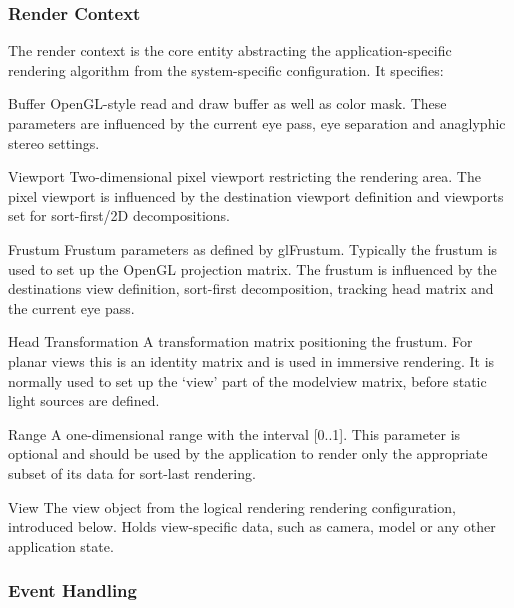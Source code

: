 \subsubsection{Render Context}

The render context is the core entity abstracting the application-specific
rendering algorithm from the system-specific configuration. It specifies:

\begin{compactdesc}

 \item[Buffer] OpenGL-style read and draw buffer as well as color mask. These
 parameters are influenced by the current eye pass, eye separation and
 anaglyphic stereo settings.

 \item[Viewport] Two-dimensional pixel viewport restricting the rendering area.
 The pixel viewport is influenced by the destination viewport definition and
 viewports set for sort-first/2D decompositions.

 \item[Frustum] Frustum parameters as defined by \textsf{glFrustum}. Typically
 the frustum is used to set up the OpenGL projection matrix. The frustum is
 influenced by the destinations view definition, sort-first decomposition,
 tracking head matrix and the current eye pass.

 \item[Head Transformation] A transformation matrix positioning the frustum. For
 planar views this is an identity matrix and is used in immersive rendering.
 It is normally used to set up the `view' part of the modelview matrix, before
 static light sources are defined.
 \item[Range] A one-dimensional range with the interval [0..1]. This parameter is
 optional and should be used by the application to render only the appropriate
 subset of its data for sort-last rendering.

\item[View] The view object from the logical rendering rendering configuration,
introduced below. Holds view-specific data, such as camera, model or any other
application state.

\end{compactdesc}

\subsubsection{Event Handling}

